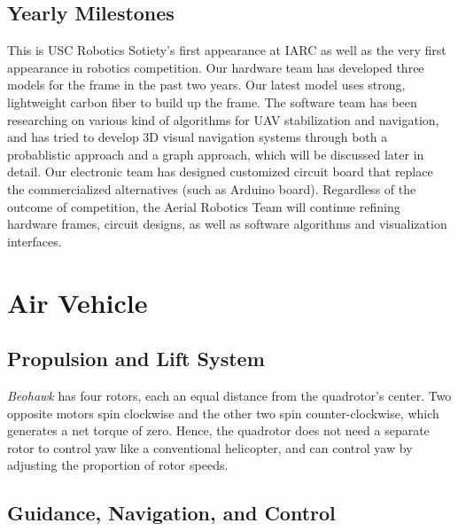 \documentclass[12pt, letterpaper]{article}
\begin{document}
\subsection{Yearly Milestones}

This is USC Robotics Sotiety's first appearance at IARC as well as the very first appearance in robotics competition. Our hardware team has developed three models for the frame in the past two years. Our latest model uses strong, lightweight carbon fiber to build up the frame. The software team has been researching on various kind of algorithms for UAV stabilization and navigation, and has tried to develop 3D visual navigation systems through both a probablistic approach and a graph approach,  which will be discussed later in detail. Our electronic team has designed customized circuit board that replace the commercialized alternatives (such as Arduino board). Regardless of the outcome of competition, the Aerial Robotics Team will continue refining hardware frames, circuit designs, as well as software algorithms and visualization interfaces.


\section{Air Vehicle}

\subsection{Propulsion and Lift System}
\emph{Beohawk} has four rotors, each an equal distance from the quadrotor's center.  Two opposite motors spin clockwise and the other two spin counter-clockwise, which generates a net torque of zero.  Hence, the quadrotor does not need a separate rotor to control yaw like a conventional helicopter, and can control yaw by adjusting the proportion of rotor speeds.   

\subsection{Guidance, Navigation, and Control}
\end{document}
